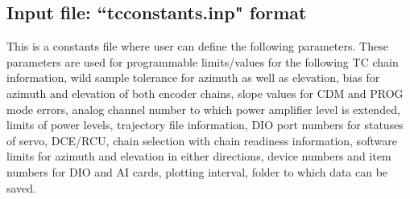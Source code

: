 \subsection{Input file: ``tcconstants.inp" format} \label{section:tcconstants}
This is a constants file where user can define the following parameters. These parameters are used for programmable limits/values for the following TC chain information, wild sample tolerance for azimuth as well as elevation, bias for azimuth and elevation of both encoder chains, slope values for CDM and PROG mode errors, analog channel number to which power amplifier level is extended, limits of power levels, trajectory file information, DIO port numbers for statuses of servo, DCE/RCU, chain selection with chain readiness information, software limits for azimuth and elevation in either directions, device numbers and item numbers for DIO and AI cards, plotting interval, folder to which data can be saved.
